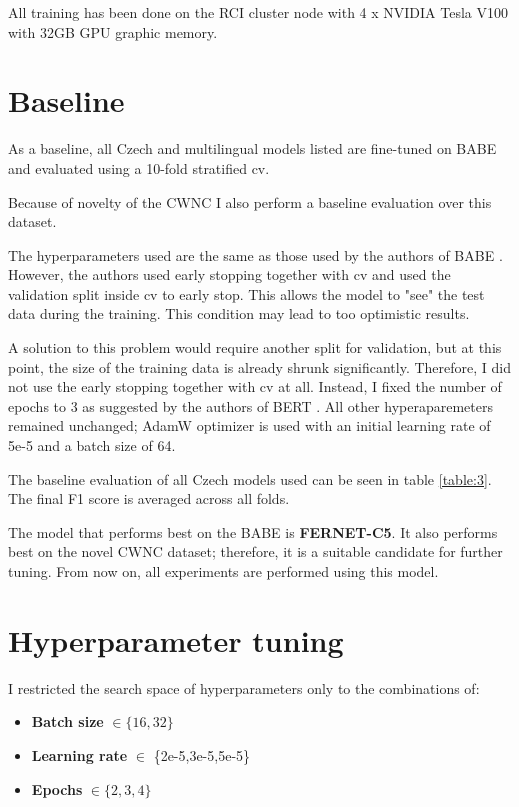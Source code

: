 All training has been done on the RCI cluster node with 4 x NVIDIA Tesla V100 with 32GB GPU graphic memory.





 \section{Baseline}
 As a baseline, all Czech and multilingual models listed are fine-tuned on BABE and evaluated using a 10-fold stratified \gls{cv}. 
 
 Because of novelty of the CWNC I also perform a baseline evaluation over this dataset.
 
 The hyperparameters used are the same as those used by the authors of BABE \cite{Spinde2021MBIC}. However, the authors used early stopping together with \gls{cv} and used the validation split inside \gls{cv} to early stop. This allows the model to "see" the test data during the training. This condition may lead to too optimistic results.
 
 A solution to this problem would require another split for validation, but at this point, the size of the training data is already shrunk significantly. Therefore, I did not use the early stopping together with \gls{cv} at all. Instead, I fixed the number of epochs to 3 as suggested by the authors of BERT \cite{devlin2019bert} . 
 All other hyperaparemeters remained unchanged; AdamW optimizer is used with an initial learning rate of 5e-5 and a batch size of 64.
 
 The baseline evaluation of all Czech models used can be seen in table \ref{table:3}. The final F1 score is averaged across all folds.
 
 The model that performs best on the BABE is \textbf{FERNET-C5}. It also performs best on the novel CWNC dataset; therefore, it is a suitable candidate for further tuning. From now on, all experiments are performed using this model.
 

 

 
 
 
 
 \section{Hyperparameter tuning}
I restricted the search space of hyperparameters only to the combinations of:
 \begin{itemize}
     \item \textbf{Batch size} $\in \{16,32\}$
     \item \textbf{Learning rate} $\in $ \{2e-5,3e-5,5e-5\}
     \item \textbf{Epochs} $\in \{2,3,4\}$
 \end{itemize}
 
